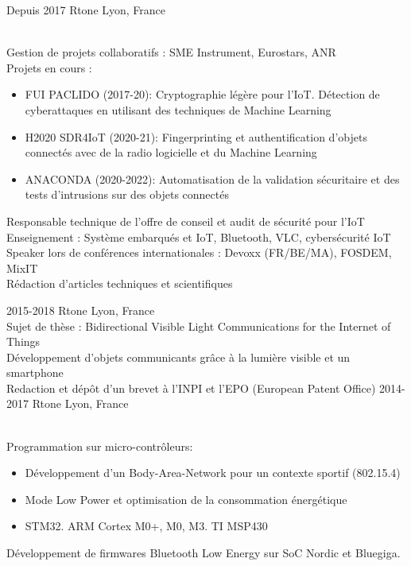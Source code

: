 \documentclass[]{cv-style}          %
\begin{document}
\begin{entrylist}
\entry
  {Depuis 2017}
  {Rtone}
  {Lyon, France}
  {\\
  Gestion de projets collaboratifs : SME Instrument, Eurostars, ANR\\
  Projets en cours :
\begin{itemize}
    \item FUI PACLIDO (2017-20): Cryptographie légère pour l'IoT. Détection de cyberattaques en utilisant des techniques de Machine Learning
    \item H2020 SDR4IoT (2020-21): Fingerprinting et authentification d'objets connectés avec de la radio logicielle et du Machine Learning
    \item ANACONDA (2020-2022): Automatisation de la validation sécuritaire et des tests d'intrusions sur des objets connectés
\end{itemize}
Responsable technique de l'offre de conseil et audit de sécurité pour l'IoT\\
Enseignement : Système embarqués et IoT, Bluetooth, VLC, cybersécurité IoT\\
Speaker lors de conférences internationales : Devoxx (FR/BE/MA), FOSDEM, MixIT\\
Rédaction d'articles techniques et scientifiques
}
\entry
  {2015-2018}
  {Rtone}
  {Lyon, France}
  {\\
  Sujet de thèse : Bidirectional Visible Light Communications for the Internet of Things\\ 
  Développement d'objets communicants grâce à la lumière visible et un smartphone\\
  Redaction et dépôt d'un brevet à l'INPI et l'EPO (European Patent Office)
 }
\entry
  {2014-2017}
  {Rtone}
  {Lyon, France}
  {\\
  Programmation sur micro-contrôleurs:
  \begin{itemize}
    \item Développement d'un Body-Area-Network pour un contexte sportif (802.15.4)
    \item Mode Low Power et optimisation de la consommation énergétique
    \item STM32. ARM Cortex M0+, M0, M3. TI MSP430
  \end{itemize}
  Développement de firmwares Bluetooth Low Energy sur SoC Nordic et Bluegiga.\\
}
\end{entrylist}
\end{document}

